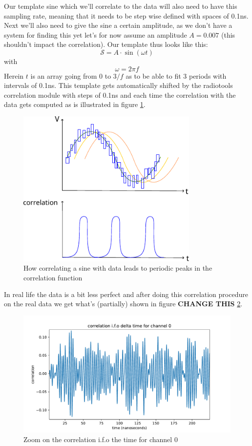 Our template sine which we'll correlate to the data will also need to have this
sampling rate, meaning that it needs to be step wise defined with spaces of
0.1ns. Next we'll also need to give the sine a certain amplitude, as we don't
have a system for finding this yet let's for now assume an amplitude $A =
0.007$ (this shouldn't impact the correlation).  Our template thus looks like
this:
\begin{equation}
	\mathcal{S} = A\cdot\sin(\omega t) 
\end{equation}
with
\begin{equation}
	\omega = 2\pi f
\end{equation}
Herein $t$ is an array going from 0 to $3/f$ as to be able to fit 3 periods
with intervals of 0.1ns.  This template gets automatically shifted by the radiotools
correlation module with steps of 0.1ns and each time the correlation with the
data gets computed as is illustrated in figure \ref{fig:SineCorrFull}.
\begin{figure}
	\centering
	\includegraphics[width=0.8\textwidth]{figures/SineDataCorrFull.pdf}
	\caption{How correlating a sine with data leads to periodic peaks in the correlation function}
	\label{fig:SineCorrFull}
\end{figure}
In real life the data is a bit less perfect and after doing this correlation
procedure on the real data we get what's (partially) shown in figure
\textbf{CHANGE THIS}
\ref{fig:CorrCh0}.
\begin{figure}
	\centering
	\includegraphics[width=\textwidth]{figures/CorrelationCh0.pdf}
	\caption{Zoom on the correlation i.f.o the time for channel 0}
	\label{fig:CorrCh0}
\end{figure}
